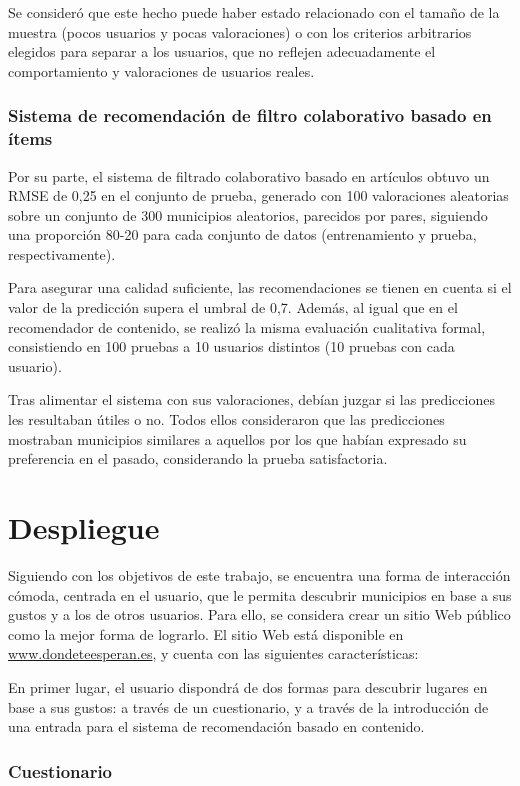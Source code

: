 Se consideró que este hecho puede haber estado relacionado con el tamaño de la muestra (pocos usuarios y pocas valoraciones) o con los criterios arbitrarios elegidos para separar a los usuarios, que no reflejen adecuadamente el comportamiento y valoraciones de usuarios reales.
 
\subsubsection{Sistema de recomendación de filtro colaborativo basado en ítems}

Por su parte, el sistema de filtrado colaborativo basado en artículos obtuvo un RMSE de 0,25 en el conjunto de prueba, generado con 100 valoraciones aleatorias sobre un conjunto de 300 municipios aleatorios, parecidos por pares, siguiendo una proporción 80-20 para cada conjunto de datos (entrenamiento y prueba, respectivamente).

Para asegurar una calidad suficiente, las recomendaciones se tienen en cuenta si el valor de la predicción supera el umbral de 0,7. Además, al igual que en el recomendador de contenido, se realizó la misma evaluación cualitativa formal, consistiendo en 100 pruebas a 10 usuarios distintos (10 pruebas con cada usuario).

Tras alimentar el sistema con sus valoraciones, debían juzgar si las predicciones les resultaban útiles o no. Todos ellos consideraron que las predicciones mostraban municipios similares a aquellos por los que habían expresado su preferencia en el pasado, considerando la prueba satisfactoria.

\section{Despliegue}

Siguiendo con los objetivos de este trabajo, se encuentra una forma de interacción cómoda, centrada en el usuario, que le permita descubrir municipios en base a sus gustos y a los de otros usuarios. Para ello, se considera crear un sitio Web público como la mejor forma de lograrlo. El sitio Web está disponible en \url{www.dondeteesperan.es}, y cuenta con las siguientes características:

En primer lugar, el usuario dispondrá de dos formas para descubrir lugares en base a sus gustos: a través de un cuestionario, y a través de la introducción de una entrada para el sistema de recomendación basado en contenido.

\subsubsection{Cuestionario}

